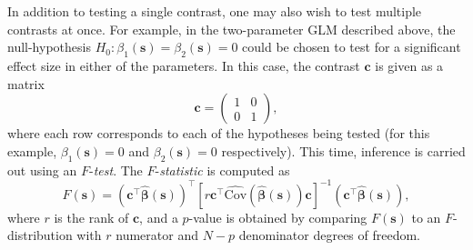 In addition to testing a single contrast, one may also wish to test multiple contrasts at once. For example, in the two-parameter GLM described above, the null-hypothesis $H_{0} : \beta_{1}(\bm{s}) = \beta_{2}(\bm{s}) = 0$ could be chosen to test for a significant effect size in either of the parameters. In this case, the contrast $\bm{c}$ is given as a matrix
\begin{equation}
\label{eq:f_stat_contrast}
\bm{c} = 
\begin{pmatrix}
1 & 0 \\
0 & 1
\end{pmatrix},
\end{equation}
where each row corresponds to each of the hypotheses being tested (for this example, $\beta_{1}(\bm{s}) = 0$ and $\beta_{2}(\bm{s}) = 0$ respectively). This time, inference is carried out using an $F$-\textit{test}. The $F$-\textit{statistic} is computed as 
\begin{equation}
\label{eq:f_statistic}
F(\bm{s}) = (\bm{c}^{\intercal}\bm{\hat{\beta}}(\bm{s}))^{\intercal}[r\bm{c}^{\intercal}\widehat{\mathrm{Cov}}(\hat{\bm{\beta}}(\bm{s}))\bm{c}]^{-1}(\bm{c}^{\intercal}\bm{\hat{\beta}}(\bm{s})),
\end{equation}
where $r$ is the rank of $\bm{c}$, and a $p$-value is obtained by comparing $F(\bm{s})$ to an $F$-distribution with $r$ numerator and $N-p$ denominator degrees of freedom. 

